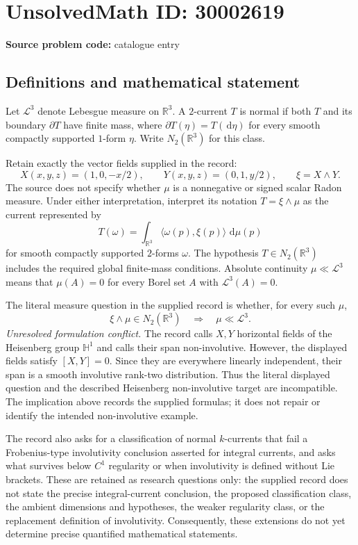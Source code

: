 \documentclass[11pt]{article}
\newcommand{\R}{\mathbb{R}}
\newcommand{\dd}{\,\mathrm{d}}
\begin{document}
\section*{UnsolvedMath ID: 30002619}
\textbf{Source problem code:} catalogue entry
\subsection{Definitions and mathematical statement}
Let \(\mathcal L^3\) denote Lebesgue measure on \(\R^3\). A \(2\)-current \(T\) is normal if both \(T\) and its boundary \(\partial T\) have finite mass, where \(\partial T(\eta)=T(\dd\eta)\) for every smooth compactly supported \(1\)-form \(\eta\). Write \(N_2(\R^3)\) for this class.

Retain exactly the vector fields supplied in the record:
\[
X(x,y,z)=(1,0,-x/2),\qquad
Y(x,y,z)=(0,1,y/2),\qquad
\xi=X\wedge Y.
\]
The source does not specify whether \(\mu\) is a nonnegative or signed scalar Radon measure. Under either interpretation, interpret its notation \(T=\xi\wedge\mu\) as the current represented by
\[
T(\omega)=\int_{\R^3}\langle\omega(p),\xi(p)\rangle\,\dd\mu(p)
\]
for smooth compactly supported \(2\)-forms \(\omega\). The hypothesis \(T\in N_2(\R^3)\) includes the required global finite-mass conditions. Absolute continuity \(\mu\ll\mathcal L^3\) means that \(\mu(A)=0\) for every Borel set \(A\) with \(\mathcal L^3(A)=0\).

The literal measure question in the supplied record is whether, for every such \(\mu\),
\[
\xi\wedge\mu\in N_2(\R^3)
\quad\Longrightarrow\quad
\mu\ll\mathcal L^3.
\]
\emph{Unresolved formulation conflict.} The record calls \(X,Y\) horizontal fields of the Heisenberg group \(\mathbb H^1\) and calls their span non-involutive. However, the displayed fields satisfy \([X,Y]=0\). Since they are everywhere linearly independent, their span is a smooth involutive rank-two distribution. Thus the literal displayed question and the described Heisenberg non-involutive target are incompatible. The implication above records the supplied formulas; it does not repair or identify the intended non-involutive example.

The record also asks for a classification of normal \(k\)-currents that fail a Frobenius-type involutivity conclusion asserted for integral currents, and asks what survives below \(C^1\) regularity or when involutivity is defined without Lie brackets. These are retained as research questions only: the supplied record does not state the precise integral-current conclusion, the proposed classification class, the ambient dimensions and hypotheses, the weaker regularity class, or the replacement definition of involutivity. Consequently, these extensions do not yet determine precise quantified mathematical statements.
\end{document}
